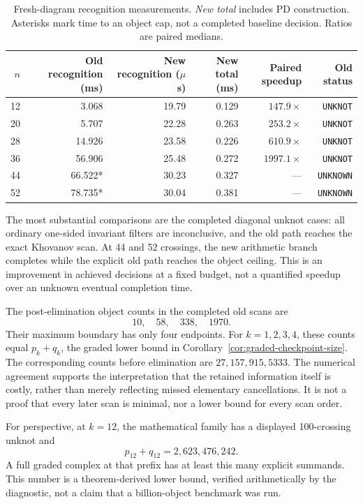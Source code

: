 \documentclass[11pt,a4paper]{article}
\theoremstyle{definition}
\theoremstyle{remark}
\newcommand{\unk}{\texttt{UNKNOT}}
\newcommand{\unknown}{\texttt{UNKNOWN}}
\numberwithin{equation}{section}
\begin{document}
\begin{table}[htbp]
\centering\small
\begin{tabular}{rrrrrr}
\toprule
\(n\) & Old recognition (ms) & New recognition (\(\mu\)s) &
New total (ms) & Paired speedup & Old status\\
\midrule
12 & 3.068 & 19.79 & 0.129 & \(147.9\times\) & \unk\\
20 & 5.707 & 22.28 & 0.263 & \(253.2\times\) & \unk\\
28 & 14.926 & 23.58 & 0.226 & \(610.9\times\) & \unk\\
36 & 56.906 & 25.48 & 0.272 & \(1997.1\times\) & \unk\\
44 & 66.522* & 30.23 & 0.327 & --- & \unknown\\
52 & 78.735* & 30.04 & 0.381 & --- & \unknown\\
\bottomrule
\end{tabular}
\caption{Fresh-diagram recognition measurements. \emph{New total} includes
PD construction. Asterisks mark time to an object cap, not a completed
baseline decision. Ratios are paired medians.}
\label{tab:rational-benchmarks}
\end{table}

The most substantial comparisons are the completed diagonal unknot cases:
all ordinary one-sided invariant filters are inconclusive, and the old path
reaches the exact Khovanov scan. At 44 and 52 crossings, the new arithmetic
branch completes while the explicit old path reaches the object ceiling.
This is an improvement in achieved decisions at a fixed budget, not a
quantified speedup over an unknown eventual completion time.

The post-elimination object counts in the completed old scans are
\[
10,\quad58,\quad338,\quad1970.
\]
Their maximum boundary has only four endpoints. For \(k=1,2,3,4\), these
counts equal \(p_k+q_k\), the graded lower bound in
Corollary~\ref{cor:graded-checkpoint-size}. The corresponding counts before
elimination are \(27,157,915,5333\). The numerical agreement supports the
interpretation that the retained information itself is costly, rather
than merely reflecting missed elementary cancellations. It is not a proof
that every later scan is minimal, nor a lower bound for every scan order.

For perspective, at \(k=12\), the mathematical family has a displayed
100-crossing unknot and
\[
 p_{12}+q_{12}=2{,}623{,}476{,}242.
\]
A full graded complex at that prefix has at least this many explicit
summands. This number is a theorem-derived lower bound, verified
arithmetically by the diagnostic, not a claim that a billion-object
benchmark was run.
\end{document}
